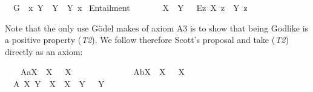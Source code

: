 \begin{isabellebody}
\ \ {\isachardoublequoteopen}G{\isacharasterisk}\ {\isasymequiv}\ {\isacharparenleft}{\isasymlambda}x{\isachardot}\ \isactrlbold {\isasymforall}Y{\isachardot}\ {\isasymP}\ Y\ \isactrlbold {\isasymleftrightarrow}\ Y\ x{\isacharparenright}{\isachardoublequoteclose}\isanewline
{}\isamarkupfalse%
\ Entailment{\isacharcolon}{\isacharcolon}{\isachardoublequoteopen}{\isasymup}{\isasymlangle}{\isasymup}{\isasymlangle}{\isasymzero}{\isasymrangle}{\isacharcomma}{\isasymup}{\isasymlangle}{\isasymzero}{\isasymrangle}{\isasymrangle}{\isachardoublequoteclose}\ {\isacharparenleft}\ {\isachardoublequoteopen}{\isasymRrightarrow}{\isachardoublequoteclose}\ {}{}{\isacharparenright}\ \ \isanewline
\ \ {\isachardoublequoteopen}X\ {\isasymRrightarrow}\ Y\ {\isasymequiv}\ \ \isactrlbold {\isasymbox}{\isacharparenleft}\isactrlbold {\isasymforall}\isactrlsup Ez{\isachardot}\ X\ z\ \isactrlbold {\isasymrightarrow}\ Y\ z{\isacharparenright}{\isachardoublequoteclose}%
\isamarkuptrue%
%
\begin{isamarkuptext}%
Note that the only use G\"odel makes of axiom A3 is to show that being Godlike is a positive property (\emph{T2}). 
 We follow therefore Scott's proposal and take (\emph{T2}) directly as an axiom:%
\end{isamarkuptext}\isamarkuptrue%
\isamarkupfalse%
\ \isanewline
\ \ A{}a{\isacharcolon}{\isachardoublequoteopen}{\isasymlfloor}\isactrlbold {\isasymforall}X{\isachardot}\ {\isasymP}\ {\isacharparenleft}\isactrlbold {\isasymrightharpoondown}X{\isacharparenright}\ \isactrlbold {\isasymrightarrow}\ \isactrlbold {\isasymnot}{\isacharparenleft}{\isasymP}\ X{\isacharparenright}\ {\isasymrfloor}{\isachardoublequoteclose}\ \ \ \ \ \ \ \ \ \ \ %
\isanewline
\ \ A{}b{\isacharcolon}{\isachardoublequoteopen}{\isasymlfloor}\isactrlbold {\isasymforall}X{\isachardot}\ \isactrlbold {\isasymnot}{\isacharparenleft}{\isasymP}\ X{\isacharparenright}\ \isactrlbold {\isasymrightarrow}\ {\isasymP}\ {\isacharparenleft}\isactrlbold {\isasymrightharpoondown}X{\isacharparenright}{\isasymrfloor}{\isachardoublequoteclose}\ \ \ \ \ \ \ \ \ \ \ \ %
\isanewline
\ \ A{}{\isacharcolon}\ {\isachardoublequoteopen}{\isasymlfloor}\isactrlbold {\isasymforall}X\ Y{\isachardot}\ {\isacharparenleft}{\isasymP}\ X\ \isactrlbold {\isasymand}\ {\isacharparenleft}X\ {\isasymRrightarrow}\ Y{\isacharparenright}{\isacharparenright}\ \isactrlbold {\isasymrightarrow}\ {\isasymP}\ Y{\isasymrfloor}{\isachardoublequoteclose}\ \ \ \ \ %

\end{isabellebody}
